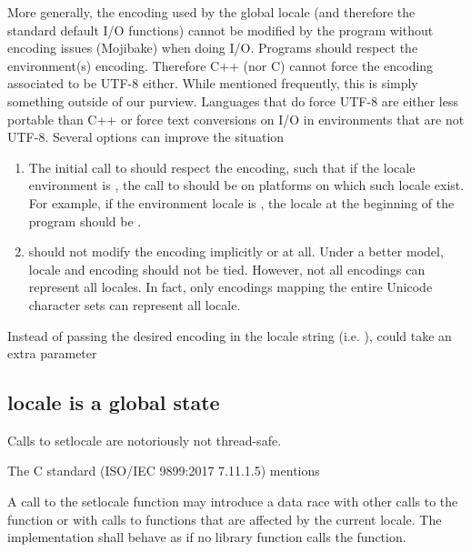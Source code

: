\documentclass{wg21}
\begin{document}
More generally, the encoding used by the global locale (and therefore the standard default I/O functions) cannot be modified by the program without encoding issues (Mojibake) when doing I/O.
Programs should respect the environment(s) encoding.
Therefore C++ (nor C) cannot force the encoding associated to be UTF-8 either. 
While mentioned frequently, this is simply something outside of our purview.
Languages that do force UTF-8 are either less portable than C++ or force text conversions on I/O in environments that are not UTF-8.
Several options can improve the situation

\begin{enumerate}
\item The initial call to  should respect the encoding, such that if the locale environment is , the call to  should be  on platforms on which such locale exist.
For example, if the environment locale is , the locale at the beginning of the program should be .

\item {} should not modify the encoding implicitly or at all. Under a better model, locale and encoding should not be tied.
However, not all encodings can represent all locales.
In fact, only encodings mapping the entire Unicode character sets can represent all locale.
\end{enumerate}

Instead of passing the desired encoding in the locale string (i.e. ),  could take an extra parameter

\subsection{locale is a global state}
Calls to setlocale are notoriously not thread-safe.

The C standard (ISO/IEC 9899:2017 7.11.1.5) mentions

\begin{quoteblock}
A call to the setlocale function may introduce a data race with other calls to the  function or with calls to functions that are affected by the current locale. The implementation shall behave as if no library function calls the  function.
\end{quoteblock}
\end{document}
